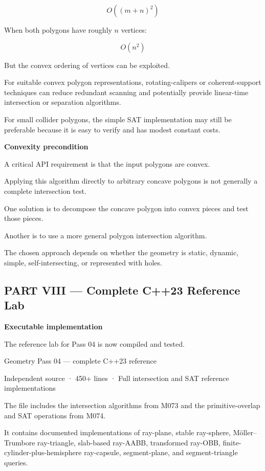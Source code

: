 \[
\boxed{ O((m+n)^2) }
\]

When both polygons have roughly \(n\) vertices:

\[
O(n^2)
\]

But the convex ordering of vertices can be exploited.

For suitable convex polygon representations, rotating-calipers or coherent-support techniques can reduce redundant scanning and potentially provide linear-time intersection or separation algorithms.

For small collider polygons, the simple SAT implementation may still be preferable because it is easy to verify and has modest constant costs.

\textbf{Convexity precondition}

A critical API requirement is that the input polygons are convex.

Applying this algorithm directly to arbitrary concave polygons is not generally a complete intersection test.

One solution is to decompose the concave polygon into convex pieces and test those pieces.

Another is to use a more general polygon intersection algorithm.

The chosen approach depends on whether the geometry is static, dynamic, simple, self-intersecting, or represented with holes.

\subsection{PART VIII --- Complete C++23 Reference Lab}\label{04-visual-computing-ii-ch025-part-viii-complete-c23-reference-lab}

\hypertarget{04-visual-computing-ii-ch025-part-viii-complete-c23-reference-lab}{}

\textbf{Executable implementation}

The reference lab for Pass 04 is now compiled and tested.

Geometry Pass 04 --- complete C++23 reference

Independent source · 450+ lines · Full intersection and SAT reference implementations

The file includes the intersection algorithms from M073 and the primitive-overlap and SAT operations from M074.

It contains documented implementations of ray-plane, stable ray-sphere, Möller--Trumbore ray-triangle, slab-based ray-AABB, transformed ray-OBB, finite-cylinder-plus-hemisphere ray-capsule, segment-plane, and segment-triangle queries.

